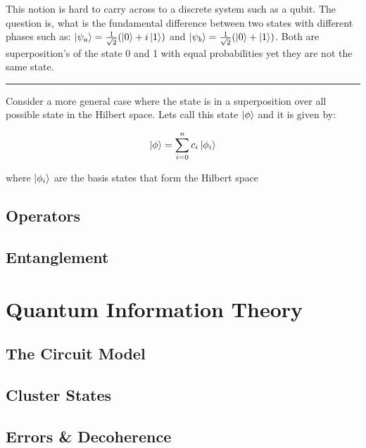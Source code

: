 This notion is hard to carry across to a discrete system such as a qubit. The question is, what is the fundamental difference between two states with different phases such as: $\left\vert{\psi_{a}}\right\rangle=\frac{1}{\sqrt{2}}(\left\vert{0}\right\rangle+i\left\vert{1}\right\rangle)$ and $\left\vert{\psi_{b}}\right\rangle=\frac{1}{\sqrt{2}}(\left\vert{0}\right\rangle+\left\vert{1}\right\rangle)$. Both are superposition's of the state 0 and 1 with equal probabilities yet they are not the same state.


\hrule
\vspace{\baselineskip}

Consider a more general case where the state is in a superposition over all possible state in the Hilbert space. Lets call this state $\left\vert{\phi}\right\rangle$ and it is given by:

\begin{equation}
\left\vert{\phi}\right\rangle = \sum_{i=0}^{n} c_{i}\left\vert{\phi_{i}}\right\rangle
\label{equation:bigphi}
\end{equation}

where $\left\vert{\phi_{i}}\right\rangle$ are the basis states that form the Hilbert space

\subsection{Operators}

\subsection{Entanglement}

\section{Quantum Information Theory}

\subsection{The Circuit Model}

\subsection{Cluster States}

\subsection{Errors \& Decoherence}

